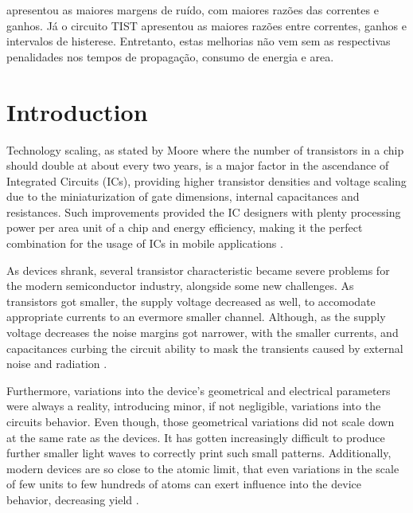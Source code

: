 \documentclass[pgmicro,diss,english]{iiufrgs}
\begin{document}
\begin{englishabstract}
{apresentou as maiores margens de ruído, com maiores razões das correntes e ganhos. Já o circuito TIST apresentou as maiores razões entre correntes, ganhos e intervalos de histerese. Entretanto, estas melhorias não vem sem as respectivas penalidades nos tempos de propagação, consumo de energia e area.

}
\end{englishabstract}

\tableofcontents

\chapter{Introduction}
	Technology scaling, as stated by Moore where the number of transistors in a chip should double at about every two years, is a major factor in the ascendance of Integrated Circuits (ICs), providing higher transistor densities and voltage scaling due to the miniaturization of gate dimensions, internal capacitances and resistances. Such improvements provided the IC designers with plenty processing power per area unit of a chip and energy efficiency, making it the perfect combination for the usage of ICs in mobile applications \cite{islam:10}.

	As devices shrank, several transistor characteristic became severe problems for the modern semiconductor industry, alongside some new challenges. As transistors got smaller, the supply voltage decreased as well, to accomodate appropriate currents to an evermore smaller channel. Although, as the supply voltage decreases the noise margins got narrower, with the smaller currents, and capacitances curbing the circuit ability to mask the transients caused by external noise and radiation \cite{abbas:15}.

	Furthermore, variations into the device's geometrical and electrical parameters were always a reality, introducing minor, if not negligible, variations into the circuits behavior. Even though, those geometrical variations did not scale down at the same rate as the devices. It has gotten increasingly difficult to produce further smaller light waves to correctly print such small patterns. Additionally, modern devices are so close to the atomic limit, that even variations in the scale of few units to few hundreds of atoms can exert influence into the device behavior, decreasing yield \cite{abbas:15}.
\end{document}

